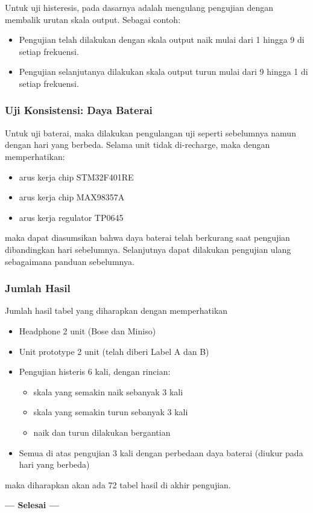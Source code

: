 \documentclass[12pt,]{article}
\begin{document}
	Untuk uji histeresis, pada dasarnya adalah mengulang pengujian dengan membalik urutan skala output.
	Sebagai contoh:
	\begin{itemize}
		\item Pengujian telah dilakukan dengan skala output naik mulai dari 1 hingga 9 di setiap frekuensi.
		\item Pengujian selanjutanya dilakukan skala output turun mulai dari 9 hingga 1 di setiap frekuensi.
	\end{itemize}
	
	\subsubsection{Uji Konsistensi: Daya Baterai}
	
	Untuk uji baterai, maka dilakukan pengulangan uji seperti sebelumnya namun dengan hari yang berbeda.
	Selama unit tidak di-recharge, maka dengan memperhatikan:
	\begin{itemize}
		\item arus kerja chip STM32F401RE
		\item arus kerja chip MAX98357A
		\item arus kerja regulator TP0645
	\end{itemize}
	maka dapat diasumsikan bahwa daya baterai telah berkurang saat pengujian dibandingkan hari sebelumnya.
	Selanjutnya dapat dilakukan pengujian ulang sebagaimana panduan sebelumnya.
	
	\subsubsection{Jumlah Hasil}
	Jumlah hasil tabel yang diharapkan dengan memperhatikan
	\begin{itemize}
		\item Headphone 2 unit (Bose dan Miniso)
		\item Unit prototype 2 unit (telah diberi Label A dan B)
		\item Pengujian histeris 6 kali, dengan rincian:
		\begin{itemize}
			\item skala yang semakin naik sebanyak 3 kali
			\item skala yang semakin turun sebanyak 3 kali
			\item naik dan turun dilakukan bergantian
		\end{itemize}
		\item Semua di atas pengujian 3 kali dengan perbedaan daya baterai (diukur pada hari yang berbeda)
	\end{itemize}
	
	maka diharapkan akan ada 72 tabel hasil di akhir pengujian.
	
	\vspace{30pt}\centering \textbf{--- Selesai ---}
	
	
\end{document}
